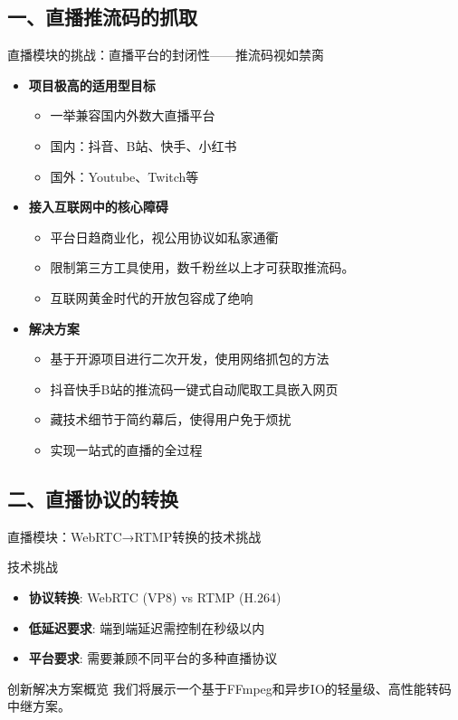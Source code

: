 \documentclass{beamer}
\begin{document}
\subsection{一、直播推流码的抓取}
\begin{frame}{直播模块的挑战：直播平台的封闭性——推流码视如禁脔}
    \begin{itemize}
        \item \textbf{项目极高的适用型目标}
              \begin{itemize}
                  \item 一举兼容国内外数大直播平台
                  \item 国内：抖音、B站、快手、小红书
                  \item 国外：Youtube、Twitch等
              \end{itemize}
              \vspace {1em}
        \item \textbf{接入互联网中的核心障碍}
              \begin{itemize}
                  \item 平台日趋商业化，视公用协议如私家通衢
                  \item 限制第三方工具使用，数千粉丝以上才可获取推流码。
                  \item 互联网黄金时代的开放包容成了绝响
              \end{itemize}
              \vspace {1em}
        \item \textbf{解决方案}
              \begin{itemize}
                  \item 基于开源项目进行二次开发，使用网络抓包的方法
                  \item 抖音快手B站的推流码一键式自动爬取工具嵌入网页
                  \item 藏技术细节于简约幕后，使得用户免于烦扰
                  \item 实现一站式的直播的全过程
              \end{itemize}
    \end{itemize}
\end{frame}


\subsection{二、直播协议的转换}
\begin{frame}{直播模块：WebRTC→RTMP转换的技术挑战}
    \begin{block}{技术挑战}
        \begin{itemize}
            \item \textbf{协议转换}: WebRTC (VP8) vs RTMP (H.264)
            \item \textbf{低延迟要求}: 端到端延迟需控制在秒级以内
            \item \textbf{平台要求}: 需要兼顾不同平台的多种直播协议
        \end{itemize}
    \end{block}
    \begin{exampleblock}{创新解决方案概览}
        我们将展示一个基于FFmpeg和异步IO的轻量级、高性能转码中继方案。
    \end{exampleblock}
\end{frame}
\end{document}
